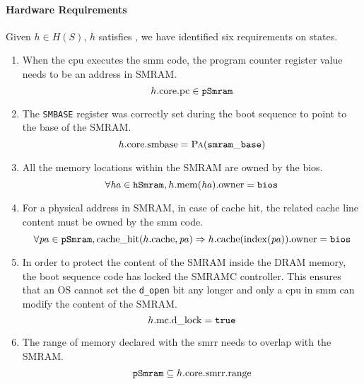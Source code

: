 \paragraph{Hardware Requirements}
%
Given \( h \in H(S) \), \( h \) satisfies , we have
identified six requirements on states.
%
\begin{enumerate}
\item When the \ac{cpu} executes the \ac{smm} code, the program counter register
  value needs to be an address in SMRAM.
  \[
    h.\mathrm{core}.\mathrm{pc} \in \texttt{pSmram}
  \]
\item The \texttt{SMBASE} register was correctly set during the boot sequence to
  point to the base of the SMRAM.
  \[
    h.\mathrm{core}.\mathrm{smbase} = \textsc{Pa}(\mathtt{smram\_base})
  \]
\item All the memory locations within the SMRAM are owned by the \ac{bios}.
  \[
    \forall \mathit{ha} \in \texttt{hSmram}, h.\mathrm{mem}(\mathit{ha}).\mathrm{owner} =
    \mathtt{bios}
  \]
\item For a physical address in SMRAM, in case of cache hit, the related cache
  line content must be owned by the \ac{smm} code.
  \[
    \forall \mathit{pa} \in \texttt{pSmram}, \mathrm{cache\_hit}(h.\mathrm{cache},
    \mathit{pa}) \Rightarrow h.\mathrm{cache}(\mathrm{index}(\mathit{pa})).\mathrm{owner} =
    \mathtt{bios}
  \]
\item In order to protect the content of the SMRAM inside the DRAM memory, the
  boot sequence code has locked the SMRAMC controller. This ensures that an OS
  cannot set the \texttt{d\_open} bit any longer and only a \ac{cpu} in \ac{smm}
  can modify the content of the SMRAM.
  \[
    h.\mathrm{mc}.\mathrm{d\_lock} = \mathtt{true}
  \]
\item The range of memory declared with the \ac{smrr} needs to overlap with the
  SMRAM.
  \[
    \texttt{pSmram} \subseteq h.\mathrm{core}.\mathrm{smrr}.\mathrm{range}
  \]
\end{enumerate}

